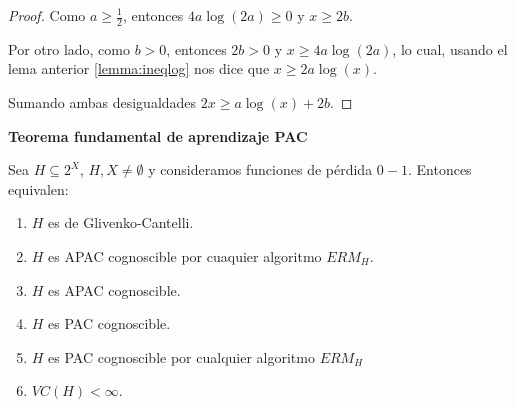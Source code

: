 \begin{proof}
 Como $a \ge \frac{1}{2}$, entonces $4a \log(2a) \ge 0$ y $x \ge 2b$.
 
 Por otro lado, como $b > 0$, entonces $2b > 0$ y $x \ge 4a \log(2a)$, lo cual, usando el lema anterior \ref{lemma:ineqlog} 
 nos dice que $x \ge 2a \log(x)$.
 
 Sumando ambas desigualdades $2x \ge a \log(x) + 2b$.
\end{proof}


\begin{theorem}
\textbf{Teorema fundamental de aprendizaje PAC}

Sea $H\subseteq 2^X$, $H,X \neq \emptyset$ y consideramos funciones de pérdida $0-1$. Entonces equivalen:

\begin{enumerate}[i]
\item \label{th:fundi} $H$ es de Glivenko-Cantelli.
\item \label{th:fundii} $H$ es APAC cognoscible por cuaquier algoritmo $ERM_H$.
\item \label{th:fundiii} $H$ es APAC cognoscible.
\item \label{th:fundiv} $H$ es PAC cognoscible.
\item \label{th:fundv} $H$ es PAC cognoscible por cualquier algoritmo $ERM_H$
\item \label{th:fundvi} $VC (H) < \infty$.
\end{enumerate}
\label{th:fundamental}
\end{theorem}

